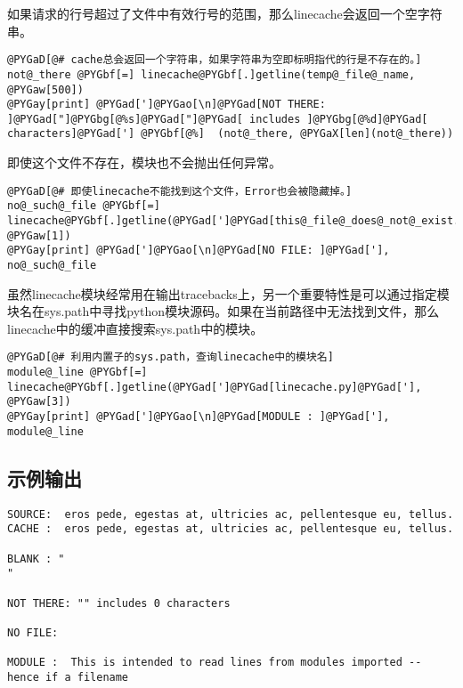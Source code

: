 \documentclass[letterpaper,10pt,english]{manual}
\begin{document}
如果请求的行号超过了文件中有效行号的范围，那么linecache会返回一个空字符串。

\begin{Verbatim}[commandchars=@\[\]]
@PYGaD[@# cache总会返回一个字符串，如果字符串为空即标明指代的行是不存在的。]
not@_there @PYGbf[=] linecache@PYGbf[.]getline(temp@_file@_name, @PYGaw[500])
@PYGay[print] @PYGad[']@PYGao[\n]@PYGad[NOT THERE: ]@PYGad["]@PYGbg[@%s]@PYGad["]@PYGad[ includes ]@PYGbg[@%d]@PYGad[ characters]@PYGad['] @PYGbf[@%]  (not@_there, @PYGaX[len](not@_there))
\end{Verbatim}

即使这个文件不存在，模块也不会抛出任何异常。

\begin{Verbatim}[commandchars=@\[\]]
@PYGaD[@# 即使linecache不能找到这个文件，Error也会被隐藏掉。]
no@_such@_file @PYGbf[=] linecache@PYGbf[.]getline(@PYGad[']@PYGad[this@_file@_does@_not@_exist.txt]@PYGad['], @PYGaw[1])
@PYGay[print] @PYGad[']@PYGao[\n]@PYGad[NO FILE: ]@PYGad['], no@_such@_file
\end{Verbatim}

虽然linecache模块经常用在输出tracebacks上，另一个重要特性是可以通过指定模块名在sys.path中寻找python模块源码。如果在当前路径中无法找到文件，那么linecache中的缓冲直接搜索sys.path中的模块。

\begin{Verbatim}[commandchars=@\[\]]
@PYGaD[@# 利用内置子的sys.path，查询linecache中的模块名]
module@_line @PYGbf[=] linecache@PYGbf[.]getline(@PYGad[']@PYGad[linecache.py]@PYGad['], @PYGaw[3])
@PYGay[print] @PYGad[']@PYGao[\n]@PYGad[MODULE : ]@PYGad['], module@_line
\end{Verbatim}


\subsection{示例输出}

\begin{Verbatim}[commandchars=@\[\]]
SOURCE:  eros pede, egestas at, ultricies ac, pellentesque eu, tellus.
CACHE :  eros pede, egestas at, ultricies ac, pellentesque eu, tellus.

BLANK : "
"

NOT THERE: "" includes 0 characters

NO FILE:

MODULE :  This is intended to read lines from modules imported -- hence if a filename
\end{Verbatim}
\end{document}

